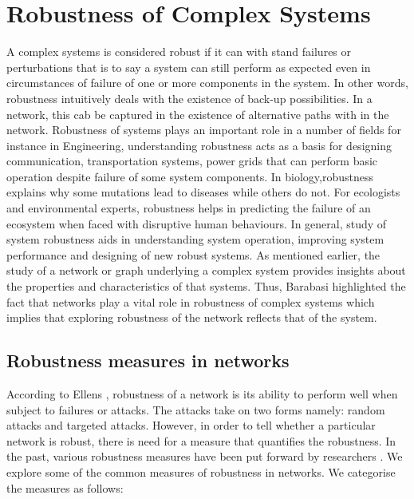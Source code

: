 \documentclass[10pt,a4paper]{article}
\begin{document}
	
\section{Robustness of Complex Systems}
	A complex systems is considered robust if it can with stand failures or perturbations that is to say a system can still perform as expected even in circumstances of failure of one or more components in the system. 
	In other words, robustness intuitively deals with the existence of back-up possibilities. In a network, this cab be captured in the existence of alternative paths with in the network.
	 Robustness of systems plays an important role in a number of fields for instance in Engineering, understanding robustness acts as a basis for designing communication, transportation systems, power grids that can perform basic operation despite failure of some system components. In biology,robustness explains why some mutations lead to diseases while others do not. For ecologists and environmental experts, robustness helps in predicting the failure of an ecosystem when faced with disruptive human behaviours. In general, study of system robustness aids in understanding system operation, improving system performance and designing of new robust systems. 
	As mentioned earlier, the study of a network or graph underlying a complex system provides insights about the properties and characteristics of that systems. Thus, Barabasi \citep{barabasi2016network} highlighted the fact that networks play a vital role in robustness of complex systems which implies that exploring robustness of the network reflects that of the system.
	 
	\subsection{Robustness measures in networks}
	According to Ellens \citep{ellens2013graph}, robustness of a network is its ability to perform well when subject to failures or attacks. The attacks take on two forms namely: random attacks and targeted attacks. However, in order to tell whether a particular network is robust, there is need for a measure that quantifies the robustness. In the past, various robustness measures have been put forward by researchers \citep{sydney2008elasticity}. We explore some of the common measures of robustness in networks. We categorise the measures as follows:
\end{document}
